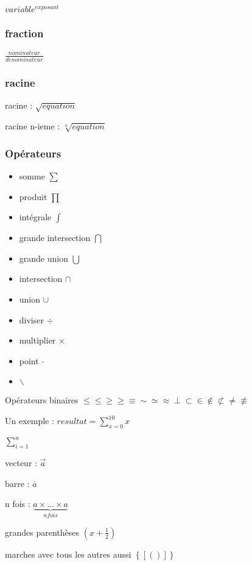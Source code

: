 $variable^{exposant}$

\subsubsection{fraction}

$\frac{nominateur}{denominateur}$

\subsubsection{racine}

racine : $\sqrt{equation}$

racine n-ieme : $\sqrt[n]{equation}$

\subsubsection{Opérateurs}


\begin{itemize}
	\item somme $\sum$
	\item produit $\prod$
	\item intégrale $\int$
	\item grande intersection $\bigcap$
	\item grande union $\bigcup$
	\item intersection $\cap$
	\item union $\cup$
	\item diviser $\div$
	\item multiplier $\times$
	\item point $\cdot$
	\item $\backslash$
\end{itemize}

Opérateurs binaires $\leq \le \geq \ge \equiv \sim \simeq \approx \perp \subset \in \not\in \not\subset \not= \not\equiv$

Un exemple : $resultat = \sum_{x=0}^{10} x$


$\displaystyle\sum\nolimits_{i=1}^n $

vecteur : $\overrightarrow{a}$

barre : $\overline{a}$

n fois : $\underbrace{a \times \dots \times a}_{n fois}$

grandes parenthèses $\left( x + \frac{1}{2} \right)$

marches avec tous les autres aussi $\left\{ \left [ \left(  \right) \right] \right\}$


